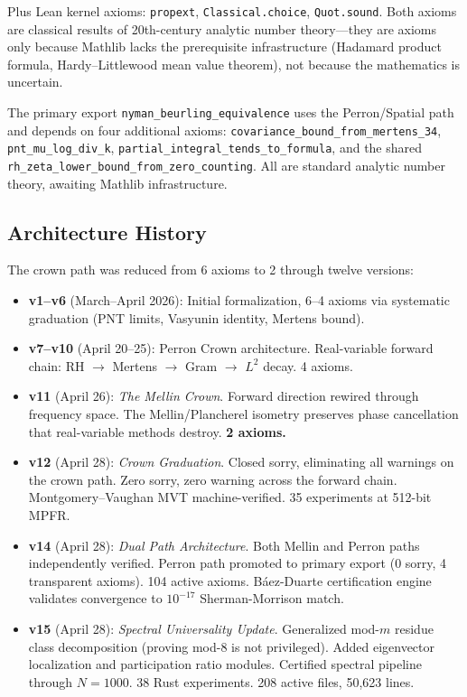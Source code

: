 \documentclass[12pt,a4paper]{article}
\begin{document}
\noindent Plus Lean kernel axioms: \texttt{propext}, \texttt{Classical.choice}, \texttt{Quot.sound}.
Both axioms are classical results of 20th-century analytic number theory---they are
axioms only because Mathlib lacks the prerequisite infrastructure (Hadamard product
formula, Hardy--Littlewood mean value theorem), not because the mathematics is uncertain.

The primary export \texttt{nyman\_beurling\_equivalence} uses the Perron/Spatial
path and depends on four additional axioms:
\texttt{covariance\_bound\_from\_mertens\_34},
\texttt{pnt\_mu\_log\_div\_k},
\texttt{partial\_integral\_tends\_to\_formula}, and
the shared \texttt{rh\_zeta\_lower\_bound\_from\_zero\_counting}.
All are standard analytic number theory, awaiting Mathlib infrastructure.

\subsection*{Architecture History}

The crown path was reduced from 6 axioms to 2 through twelve versions:

\begin{itemize}
\item \textbf{v1--v6} (March--April 2026): Initial formalization, 6--4 axioms via
  systematic graduation (PNT limits, Vasyunin identity, Mertens bound).
\item \textbf{v7--v10} (April 20--25): Perron Crown architecture. Real-variable
  forward chain: RH $\to$ Mertens $\to$ Gram $\to$ $L^2$ decay. 4 axioms.
\item \textbf{v11} (April 26): \emph{The Mellin Crown}. Forward direction rewired
  through frequency space. The Mellin/Plancherel isometry preserves phase
  cancellation that real-variable methods destroy. \textbf{2 axioms.}
\item \textbf{v12} (April 28): \emph{Crown Graduation}. Closed
   sorry, eliminating all warnings on the
  crown path. Zero sorry, zero warning across the forward chain.
  Montgomery--Vaughan MVT machine-verified. 35 experiments at 512-bit MPFR.
\item \textbf{v14} (April 28): \emph{Dual Path Architecture}. Both Mellin
  and Perron paths independently verified. Perron path promoted to primary
  export (0 sorry, 4 transparent axioms). 104 active axioms.
  B\'aez-Duarte certification engine validates convergence to $10^{-17}$
  Sherman-Morrison match.
\item \textbf{v15} (April 28): \emph{Spectral Universality Update}.
  Generalized mod-$m$ residue class decomposition (proving mod-8
  is not privileged). Added eigenvector localization and participation
  ratio modules. Certified spectral pipeline through $N = 1000$.
  38 Rust experiments. 208 active files, 50{,}623 lines.
\end{itemize}
\end{document}
